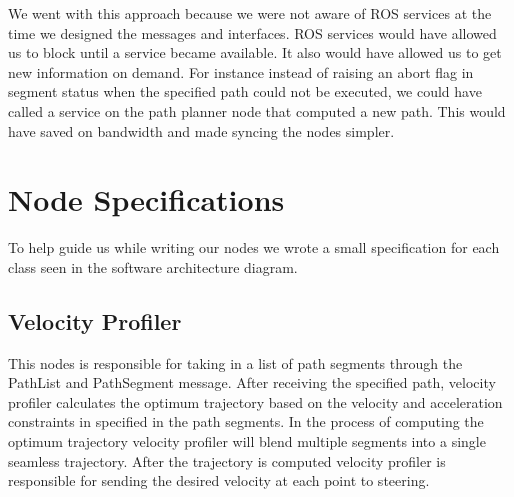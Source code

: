 We went with this approach because we were not aware of ROS services at the time we designed the messages and interfaces. ROS services would have allowed us to block until a service became available. It also would have allowed us to get new information on demand. For instance instead of raising an abort flag in segment status when the specified path could not be executed, we could have called a service on the path planner node that computed a new path. This would have saved on bandwidth and made syncing the nodes simpler.

\section{Node Specifications}

To help guide us while writing our nodes we wrote a small
specification for each class seen in the software architecture diagram.

\subsection{Velocity Profiler}
This nodes is responsible for taking in a list of path segments through the PathList and PathSegment message. After receiving the specified path, velocity profiler calculates the optimum trajectory based on the velocity and acceleration constraints in specified in the path segments. In the process of computing the optimum trajectory velocity profiler will blend multiple segments into a single seamless trajectory. After the trajectory is computed velocity profiler is responsible for sending the desired velocity at each point to steering.

